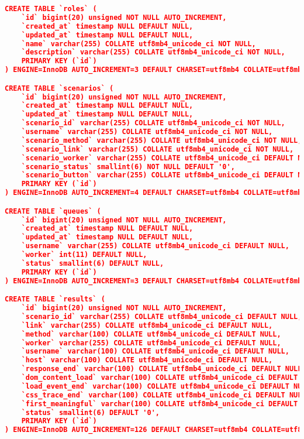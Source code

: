 \begin{lstlisting}[frame=single,tabsize=2,breaklines,caption={Basis data MySQL},label=mysql, captionpos=b, language=json]
CREATE TABLE `roles` (
	`id` bigint(20) unsigned NOT NULL AUTO_INCREMENT,
	`created_at` timestamp NULL DEFAULT NULL,
	`updated_at` timestamp NULL DEFAULT NULL,
	`name` varchar(255) COLLATE utf8mb4_unicode_ci NOT NULL,
	`description` varchar(255) COLLATE utf8mb4_unicode_ci NOT NULL,
	PRIMARY KEY (`id`)
) ENGINE=InnoDB AUTO_INCREMENT=3 DEFAULT CHARSET=utf8mb4 COLLATE=utf8mb4_unicode_ci;

CREATE TABLE `scenarios` (
	`id` bigint(20) unsigned NOT NULL AUTO_INCREMENT,
	`created_at` timestamp NULL DEFAULT NULL,
	`updated_at` timestamp NULL DEFAULT NULL,
	`scenario_id` varchar(255) COLLATE utf8mb4_unicode_ci NOT NULL,
	`username` varchar(255) COLLATE utf8mb4_unicode_ci NOT NULL,
	`scenario_method` varchar(255) COLLATE utf8mb4_unicode_ci NOT NULL,
	`scenario_link` varchar(255) COLLATE utf8mb4_unicode_ci NOT NULL,
	`scenario_worker` varchar(255) COLLATE utf8mb4_unicode_ci DEFAULT NULL,
	`scenario_status` smallint(6) NOT NULL DEFAULT '0',
	`scenario_button` varchar(255) COLLATE utf8mb4_unicode_ci DEFAULT NULL,
	PRIMARY KEY (`id`)
) ENGINE=InnoDB AUTO_INCREMENT=4 DEFAULT CHARSET=utf8mb4 COLLATE=utf8mb4_unicode_ci;

CREATE TABLE `queues` (
	`id` bigint(20) unsigned NOT NULL AUTO_INCREMENT,
	`created_at` timestamp NULL DEFAULT NULL,
	`updated_at` timestamp NULL DEFAULT NULL,
	`username` varchar(255) COLLATE utf8mb4_unicode_ci DEFAULT NULL,
	`worker` int(11) DEFAULT NULL,
	`status` smallint(6) DEFAULT NULL,
	PRIMARY KEY (`id`)
) ENGINE=InnoDB AUTO_INCREMENT=3 DEFAULT CHARSET=utf8mb4 COLLATE=utf8mb4_unicode_ci;

CREATE TABLE `results` (
	`id` bigint(20) unsigned NOT NULL AUTO_INCREMENT,
	`scenario_id` varchar(255) COLLATE utf8mb4_unicode_ci DEFAULT NULL,
	`link` varchar(255) COLLATE utf8mb4_unicode_ci DEFAULT NULL,
	`method` varchar(100) COLLATE utf8mb4_unicode_ci DEFAULT NULL,
	`worker` varchar(255) COLLATE utf8mb4_unicode_ci DEFAULT NULL,
	`username` varchar(100) COLLATE utf8mb4_unicode_ci DEFAULT NULL,
	`host` varchar(100) COLLATE utf8mb4_unicode_ci DEFAULT NULL,
	`response_end` varchar(100) COLLATE utf8mb4_unicode_ci DEFAULT NULL,
	`dom_content_load` varchar(100) COLLATE utf8mb4_unicode_ci DEFAULT NULL,
	`load_event_end` varchar(100) COLLATE utf8mb4_unicode_ci DEFAULT NULL,
	`css_trace_end` varchar(100) COLLATE utf8mb4_unicode_ci DEFAULT NULL,
	`first_meaningful` varchar(100) COLLATE utf8mb4_unicode_ci DEFAULT NULL,
	`status` smallint(6) DEFAULT '0',
	PRIMARY KEY (`id`)
) ENGINE=InnoDB AUTO_INCREMENT=126 DEFAULT CHARSET=utf8mb4 COLLATE=utf8mb4_unicode_ci;


\end{lstlisting}
